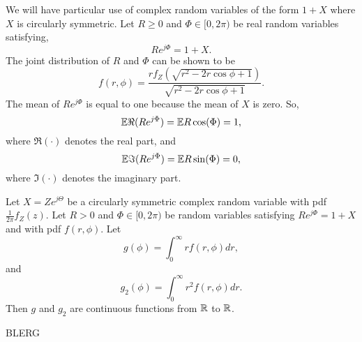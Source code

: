 \documentclass[journal]{IEEEtran}
\begin{document}
We will have particular use of complex random variables of the form $1 + X$ where $X$ is circularly symmetric.  Let $R \geq 0$ and $\Phi \in [0,2\pi)$ be real random variables satisfying, 
\[
R e^{j\Phi} = 1 + X.
\]
The joint distribution of $R$ and $\Phi$ can be shown to be
\[
f(r,\phi) = \frac{r f_Z(\sqrt{r^2 - 2r\cos\phi + 1})}{\sqrt{r^2 - 2r\cos\phi + 1}}.
\]
The mean of $R e^{j\Phi}$ is equal to one because the mean of $X$ is zero.  So,
\begin{equation}\label{eq:expectRepartRphi}
{\mathbb E} \Re(R e^{j\Phi}) = {\mathbb E} R \cos(\Phi) = 1,
\end{equation}
where $\Re(\cdot)$ denotes the real part, and
\begin{equation}\label{eq:expectImpartRphi}
{\mathbb E} \Im(R e^{j\Phi}) = {\mathbb E} R \sin(\Phi) = 0,
\end{equation}
where $\Im(\cdot)$ denotes the imaginary part.  %

\begin{lemma}\label{lem:gg2cont}
Let $X = Z e^{j\Theta}$ be a circularly symmetric complex random variable with pdf $\tfrac{1}{2\pi}f_Z(z)$.  Let $R > 0$ and $\Phi \in [0, 2\pi)$ be random variables satisfying $R e^{j\Phi} = 1 + X$ and with pdf $f(r,\phi)$.  Let
\[
g(\phi) = \int_{0}^\infty r f(r, \phi) dr,
\]
and
\[
g_2(\phi) = \int_{0}^\infty r^2 f(r, \phi) dr.
\]
Then $g$ and $g_2$ are continuous functions from ${\mathbb R}$ to ${\mathbb R}$.
\end{lemma}
\begin{IEEEproof}
BLERG
\end{IEEEproof}

\end{document}
